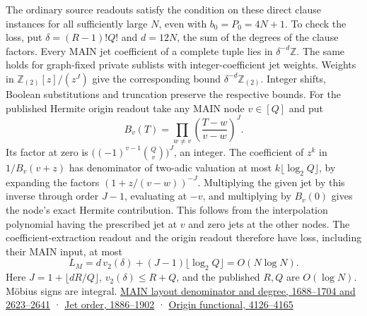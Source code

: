 \documentclass[11pt,a4paper]{article}
\begin{document}
The ordinary source readouts satisfy the condition on these direct
clause instances for all sufficiently large \(N\), even with
\(b_0=P_0=4N+1\). To check the loss, put \(\delta=(R-1)!Q!\) and
\(d=12N\), the sum of the degrees of the clause factors. Every MAIN jet
coefficient of a complete tuple lies in \(\delta^{-d}\mathbb Z\). The
same holds for graph-fixed private sublists with integer-coefficient jet
weights. Weights in \(\mathbb Z_{(2)}[z]/(z^J)\) give the corresponding
bound \(\delta^{-d}\mathbb Z_{(2)}\). Integer shifts, Boolean
substitutions and truncation preserve the respective bounds. For the
published Hermite origin readout take any MAIN node \(v\in[Q]\) and put
\[
 B_v(T)=\prod_{w\ne v}\left(\frac{T-w}{v-w}\right)^J .
\] Its factor at zero is \(\bigl((-1)^{v-1}\binom Qv\bigr)^J\), an
integer. The coefficient of \(z^k\) in \(1/B_v(v+z)\) has denominator of
two-adic valuation at most \(k\lfloor\log_2 Q\rfloor\), by expanding the
factors \((1+z/(v-w))^{-J}\). Multiplying the given jet by this inverse
through order \(J-1\), evaluating at \(-v\), and multiplying by
\(B_v(0)\) gives the node's exact Hermite contribution. This follows
from the interpolation polynomial having the prescribed jet at \(v\) and
zero jets at the other nodes. The coefficient-extraction readout and the
origin readout therefore have loss, including their MAIN input, at most
\[
 L_M=d\,v_2(\delta)+(J-1)\lfloor\log_2 Q\rfloor=O(N\log N).
\] Here \(J=1+\lfloor dR/Q\rfloor\), \(v_2(\delta)\le R+Q\), and the
published \(R,Q\) are \(O(\log N)\). Möbius signs are integral.
\href{https://github.com/openai/math/blob/main/preprints/The-Exponential-Time-Hypothesis-is-False-October-25-2026/build/main_full_version.tex\#L2623}{MAIN
layout denominator and degree, 1688--1704 and 2623--2641} ·
\href{https://github.com/openai/math/blob/main/preprints/The-Exponential-Time-Hypothesis-is-False-October-25-2026/build/main_full_version.tex\#L1886}{Jet
order, 1886--1902} ·
\href{https://github.com/openai/math/blob/main/preprints/The-Exponential-Time-Hypothesis-is-False-October-25-2026/build/main_full_version.tex\#L4126}{Origin
functional, 4126--4165}
\end{document}
